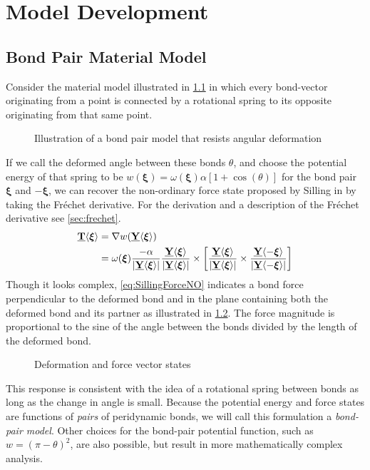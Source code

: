\chapter{Model Development}
\label{ch:ModelDev}

\section{Bond Pair Material Model}
Consider the material model illustrated in \cref{fig:SimpleBondpair} in which every bond-vector originating from a point is connected by a rotational spring to its opposite originating from that same point.
%
\begin{figure}[h]
\centering
{}
\caption{Illustration of a bond pair model that resists angular deformation}
\label{fig:SimpleBondpair}
\end{figure}
%
If we call the deformed angle between these bonds \(\theta\), and choose the potential energy of that spring to be \(w(\boldsymbol{\xi}) = \omega(\boldsymbol{\xi})\alpha [1 + \cos(\theta) ] \) for the bond pair $\boldsymbol{\xi}$ and $-\boldsymbol{\xi}$, we can recover the non-ordinary force state proposed by Silling in \cite{silling2007peridynamic} by taking the Fr\'echet derivative. For the derivation and a description of the Fr\'echet derivative see \cref{sec:frechet}.
%
\begin{align}
\label{eq:SillingForceNO}
\vstate{T}{}{\boldsymbol{\xi}} &= \nabla w\!\left(\vstate{Y}{}{\boldsymbol{\xi}}\right)\notag \\
%
&=\omega(\boldsymbol{\xi})\frac{-\alpha}{|\vstate{Y}{}{\boldsymbol{\xi}}|} \frac{\vstate{Y}{}{\boldsymbol{\xi}}}{|\vstate{Y}{}{\boldsymbol{\xi}}|} \times \left[\frac{\vstate{Y}{}{\boldsymbol{\xi}}}{|\vstate{Y}{}{\boldsymbol{\xi}}|} \times \frac{\vstate{Y}{}{-\boldsymbol{\xi}}}{|\vstate{Y}{}{-\boldsymbol{\xi}}|}\right]
\end{align}
%
Though it looks complex, \cref{eq:SillingForceNO} indicates a bond force perpendicular to the deformed bond and in the plane containing both the deformed bond and its partner as illustrated in \cref{fig:Bondpair}. 
The force magnitude is proportional to the sine of the angle between the bonds divided by the length of the deformed bond. 
%
\begin{figure}[h]
  \vspace{5mm}
\centering
{}
\caption{Deformation and force vector states}
\label{fig:Bondpair}
\end{figure}
%
This response is consistent with the idea of a rotational spring between bonds as long as the change in angle is small. 
Because the potential energy and force states are functions of \textit{pairs} of peridynamic bonds, we will call this formulation a \textit{bond-pair model}. 
Other choices for the bond-pair potential function, such as $w = (\pi - \theta)^2$, are also possible, but result in more mathematically complex analysis.

